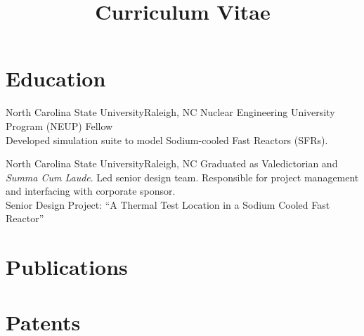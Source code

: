\documentclass[letterpaper,11pt,nocolor,final]{moderncv}
\title{Curriculum Vitae}
\begin{document}
\maketitle

\nocite{*}


\section{Education}  

    {North Carolina State University}{Raleigh, NC}{}{
    Nuclear Engineering University Program (NEUP) Fellow \\
    Developed simulation suite to model Sodium-cooled Fast Reactors (SFRs).
    \vspace{-1\topsep}
    \printbibliography[keyword={mastersthesis},heading=none]}
  \vspace{\topsep}

    {North Carolina State University}{Raleigh, NC}{}{
    Graduated as Valedictorian and \textit{Summa Cum Laude}.
    Led senior design team. Responsible for project management and interfacing
      with corporate sponsor. \\
    Senior Design Project: ``A Thermal Test Location in a Sodium Cooled Fast
      Reactor''}


\section{Publications}
  \printbibliography[keyword={publications},heading=none]



\section{Patents}
  \printbibliography[keyword={patents},heading=none]
\end{document}
